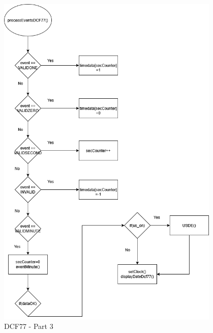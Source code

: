 \documentclass[a4paper,12pt]{article}
\begin{document}
\begin{figure}[H]
    \centering
    \includegraphics[width=0.95\textwidth]{diagrams/7.dcf773.png}
    \caption{DCF77 - Part 3}
    \label{fig:DCF773}
\end{figure}
\end{document}
